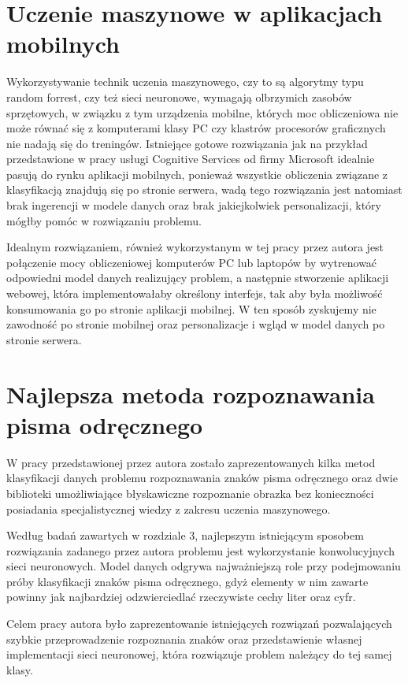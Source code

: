 \documentclass[brudnopis]{xmgr}
\begin{document}
\section{Uczenie maszynowe w aplikacjach mobilnych}

Wykorzystywanie technik uczenia maszynowego, czy to są algorytmy typu random forrest, czy też sieci neuronowe, wymagają olbrzymich zasobów sprzętowych, w związku z tym urządzenia mobilne, których moc obliczeniowa nie może równać się z komputerami klasy PC czy klastrów procesorów graficznych nie nadają się do treningów. Istniejące gotowe rozwiązania jak na przykład przedstawione w pracy usługi Cognitive Services od firmy Microsoft idealnie pasują do rynku aplikacji mobilnych, ponieważ wszystkie obliczenia związane z klasyfikacją znajdują się po stronie serwera, wadą tego rozwiązania jest natomiast brak ingerencji w modele danych oraz brak jakiejkolwiek personalizacji, który mógłby pomóc w rozwiązaniu problemu.

Idealnym rozwiązaniem, również wykorzystanym w tej pracy przez autora jest połączenie mocy obliczeniowej komputerów PC lub laptopów by wytrenować odpowiedni model danych realizujący problem, a następnie stworzenie aplikacji webowej, która implementowałaby określony interfejs, tak aby była możliwość konsumowania go po stronie aplikacji mobilnej. W ten sposób zyskujemy nie zawodność po stronie mobilnej oraz personalizacje i wgląd w model danych po stronie serwera.

\section{Najlepsza metoda rozpoznawania pisma odręcznego}

W pracy przedstawionej przez autora zostało zaprezentowanych kilka metod klasyfikacji danych problemu rozpoznawania znaków pisma odręcznego oraz dwie biblioteki umożliwiające błyskawiczne rozpoznanie obrazka bez konieczności posiadania specjalistycznej wiedzy z zakresu uczenia maszynowego.

Według badań zawartych w rozdziale 3, najlepszym istniejącym sposobem rozwiązania zadanego przez autora problemu jest wykorzystanie konwolucyjnych sieci neuronowych. Model danych odgrywa najważniejszą role przy podejmowaniu próby klasyfikacji znaków pisma odręcznego, gdyż elementy w nim zawarte powinny jak najbardziej odzwierciedlać rzeczywiste cechy liter oraz cyfr.

\summary

Celem pracy autora było zaprezentowanie istniejących rozwiązań pozwalających szybkie przeprowadzenie rozpoznania znaków oraz przedstawienie własnej implementacji sieci neuronowej, która rozwiązuje problem należący do tej samej klasy. 
\end{document}

